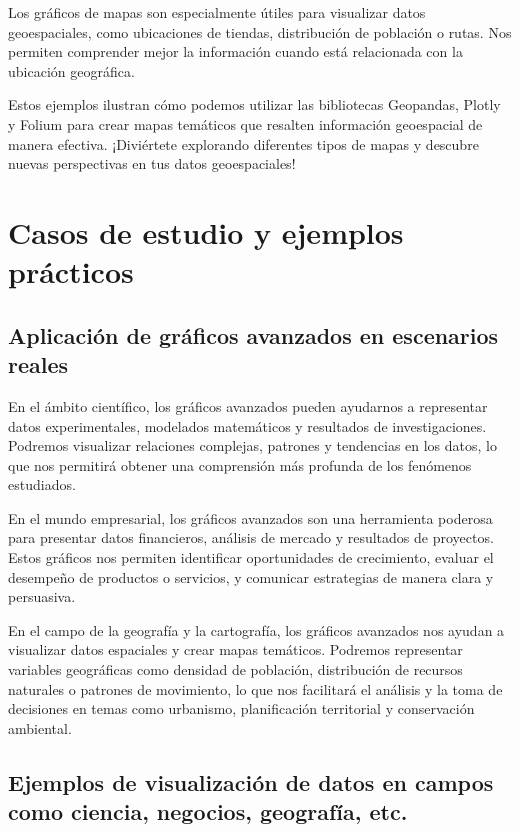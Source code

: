 \documentclass[
  a4paper,
]{article}
\begin{document}
Los gráficos de mapas son especialmente útiles para visualizar datos
geoespaciales, como ubicaciones de tiendas, distribución de población o
rutas. Nos permiten comprender mejor la información cuando está
relacionada con la ubicación geográfica.

Estos ejemplos ilustran cómo podemos utilizar las bibliotecas Geopandas,
Plotly y Folium para crear mapas temáticos que resalten información
geoespacial de manera efectiva. ¡Diviértete explorando diferentes tipos
de mapas y descubre nuevas perspectivas en tus datos geoespaciales!

\hypertarget{casos-de-estudio-y-ejemplos-pruxe1cticos}{%
\section{Casos de estudio y ejemplos
prácticos}\label{casos-de-estudio-y-ejemplos-pruxe1cticos}}

\hypertarget{aplicaciuxf3n-de-gruxe1ficos-avanzados-en-escenarios-reales}{%
\subsection{Aplicación de gráficos avanzados en escenarios
reales}\label{aplicaciuxf3n-de-gruxe1ficos-avanzados-en-escenarios-reales}}

En el ámbito científico, los gráficos avanzados pueden ayudarnos a
representar datos experimentales, modelados matemáticos y resultados de
investigaciones. Podremos visualizar relaciones complejas, patrones y
tendencias en los datos, lo que nos permitirá obtener una comprensión
más profunda de los fenómenos estudiados.

En el mundo empresarial, los gráficos avanzados son una herramienta
poderosa para presentar datos financieros, análisis de mercado y
resultados de proyectos. Estos gráficos nos permiten identificar
oportunidades de crecimiento, evaluar el desempeño de productos o
servicios, y comunicar estrategias de manera clara y persuasiva.

En el campo de la geografía y la cartografía, los gráficos avanzados nos
ayudan a visualizar datos espaciales y crear mapas temáticos. Podremos
representar variables geográficas como densidad de población,
distribución de recursos naturales o patrones de movimiento, lo que nos
facilitará el análisis y la toma de decisiones en temas como urbanismo,
planificación territorial y conservación ambiental.

\hypertarget{ejemplos-de-visualizaciuxf3n-de-datos-en-campos-como-ciencia-negocios-geografuxeda-etc.}{%
\subsection{Ejemplos de visualización de datos en campos como ciencia,
negocios, geografía,
etc.}\label{ejemplos-de-visualizaciuxf3n-de-datos-en-campos-como-ciencia-negocios-geografuxeda-etc.}}
\end{document}
